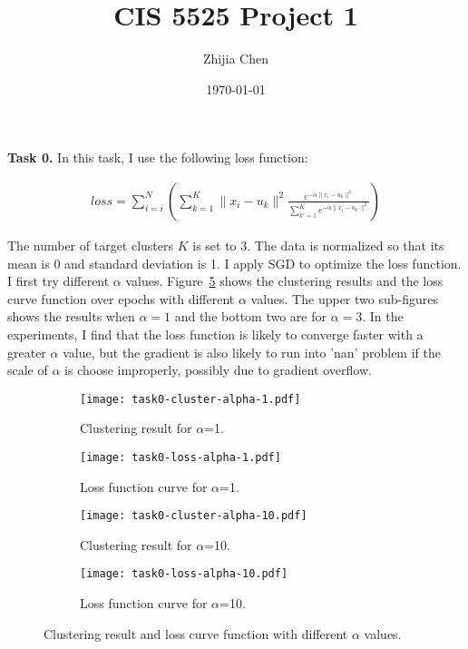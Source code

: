 \documentclass{article}
\title{CIS 5525 Project 1}
\author{Zhijia Chen}
\date{\today}
\begin{document}
\begin{titlepage}
    \maketitle
\end{titlepage}

\textbf{Task 0.}
\vspace{\baselineskip}
In this task, I use the following loss function:

\begin{align*}
    loss = \sum_{i=i}^{N}{\left(\sum_{k=1}^{K}\|x_i-u_k\|^2\frac{e^{-\alpha\|x_i-u_k\|^2}}{\sum_{k'=1}^{K}e^{-\alpha\|x_i-u_{k'}\|^2}}\right)}
\end{align*}

The number of target clusters $K$ is set to 3. The data is normalized so that its mean is 0 and standard deviation is 1. I apply SGD to optimize the loss function. I first try different $\alpha$ values. Figure~\ref{fig:task0} shows the clustering results and the loss curve function over epochs with different $\alpha$ values. The upper two sub-figures shows the results when $\alpha=1$ and the bottom two are for $\alpha=3$. In the experiments, I find that the loss function is likely to converge faster with a greater $\alpha$ value, but the gradient is also likely to run into 'nan' problem if the scale of $\alpha$ is choose improperly, possibly due to gradient overflow.  
\begin{figure}[h!]
    \centering
    \begin{subfigure}{.33\textwidth}
      \centering
      \texttt{[image: task0-cluster-alpha-1.pdf]}
      \caption{Clustering result for $\alpha$=1.}
      \label{fig:cluster1}
    \end{subfigure}%
    \begin{subfigure}{.66\textwidth}
      \centering
      \texttt{[image: task0-loss-alpha-1.pdf]}
      \caption{Loss function curve for $\alpha$=1.}
      \label{fig:loss1}
    \end{subfigure}
    \centering
    \begin{subfigure}{.33\textwidth}
      \centering
      \texttt{[image: task0-cluster-alpha-10.pdf]}
      \caption{Clustering result for $\alpha$=10.}
      \label{fig:cluster10}
    \end{subfigure}%
    \begin{subfigure}{.66\textwidth}
      \centering
      \texttt{[image: task0-loss-alpha-10.pdf]}
      \caption{Loss function curve for $\alpha$=10.}
      \label{fig:loss10}
    \end{subfigure}
    \caption{Clustering result and loss curve function with different $\alpha$ values.}
    \label{fig:task0}
\end{figure}
\end{document}
